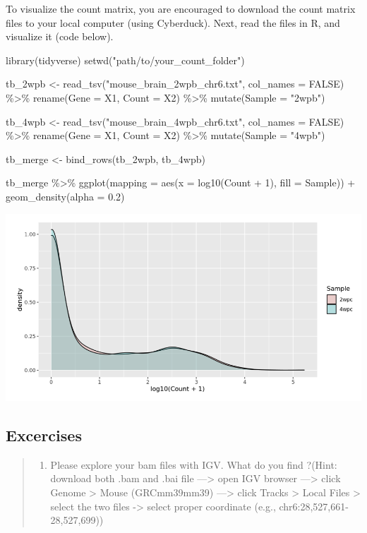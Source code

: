 \documentclass[
]{book}
\newenvironment{Shaded}{\begin{snugshade}}{\end{snugshade}}
\newcommand{\NormalTok}[1]{#1}
\providecommand{\tightlist}{%
  \setlength{\itemsep}{0pt}\setlength{\parskip}{0pt}}
\begin{document}
To visualize the count matrix, you are encouraged to download the count matrix files to your local computer (using Cyberduck). Next, read the files in R, and visualize it (code below).

\begin{Shaded}
\begin{Highlighting}[]

\NormalTok{library(tidyverse)}
\NormalTok{setwd("path/to/your\_count\_folder")}


\NormalTok{tb\_2wpb \textless{}{-} read\_tsv("mouse\_brain\_2wpb\_chr6.txt", col\_names = FALSE) \%\textgreater{}\% }
\NormalTok{  rename(Gene = X1, Count = X2) \%\textgreater{}\% }
\NormalTok{  mutate(Sample = "2wpb")}

\NormalTok{tb\_4wpb \textless{}{-} read\_tsv("mouse\_brain\_4wpb\_chr6.txt", col\_names = FALSE) \%\textgreater{}\% }
\NormalTok{  rename(Gene = X1, Count = X2) \%\textgreater{}\%}
\NormalTok{  mutate(Sample = "4wpb")}

\NormalTok{tb\_merge \textless{}{-} bind\_rows(tb\_2wpb, tb\_4wpb)}

\NormalTok{tb\_merge \%\textgreater{}\% ggplot(mapping = aes(x = log10(Count + 1), fill = Sample)) +}
\NormalTok{  geom\_density(alpha = 0.2)}
\end{Highlighting}
\end{Shaded}

\includegraphics{figures/count_distribution.png}

\hypertarget{excercises}{%
\subsection{Excercises}\label{excercises}}

\begin{quote}
\begin{enumerate}
\def\labelenumi{\arabic{enumi}.}
\tightlist
\item
  Please explore your bam files with IGV. What do you find ?(Hint: download both .bam and .bai file ---\textgreater{} open IGV browser ---\textgreater{} click Genome \textgreater{} Mouse (GRCmm39mm39) ---\textgreater{} click Tracks \textgreater{} Local Files \textgreater{} select the two files -\textgreater{} select proper coordinate (e.g., chr6:28,527,661-28,527,699))
\end{enumerate}
\end{quote}
\end{document}
